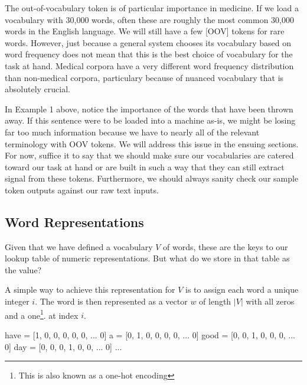 The out-of-vocabulary token is of particular importance in medicine. If we load a vocabulary with 30,000 words, often these are roughly the most common 30,000 words in the English language. We will still have a few [OOV] tokens
for rare words. However, just because a general system chooses its vocabulary based on word frequency does not mean that this is the best choice of vocabulary for the task at hand. Medical corpora have a very different word frequency
distribution than non-medical corpora, particulary because of nuanced vocabulary that is absolutely crucial.


In Example 1 above, notice the importance of the words that have been thrown away. If this sentence were to be loaded into a machine as-is, we might be losing far too much information because we have to nearly all of the relevant terminology with OOV tokens.
We will address this issue in the ensuing sections. For now, suffice it to say that we should make sure our vocabularies are catered toward our task at hand or are built in such a way that they can still extract signal from these tokens. Furthermore, we should always sanity check our sample token outputs against our raw text inputs.

\subsection{Word Representations}

Given that we have defined a vocabulary $V$ of words, these are the keys to our lookup table of numeric representations. But what do we store in that table as the value?

A simple way to achieve this representation for $V$ is to assign each word a unique integer $i$.
The word is then represented as a vector $w$ of length $|V|$ with all zeros and a one\footnote{This is also known as a one-hot encoding}. at index $i$.

\begin{python}
  have = [1, 0, 0, 0, 0, 0, ... 0]
  a    = [0, 1, 0, 0, 0, 0, ... 0]
  good = [0, 0, 1, 0, 0, 0, ... 0]
  day  = [0, 0, 0, 1, 0, 0, ... 0]
  ...
\end{python}

